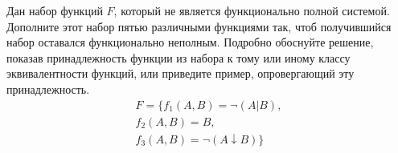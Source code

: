 \question
Дан набор функций $F$, который не является функционально полной системой. Дополните этот набор пятью различными функциями так, чтоб получившийся набор оставался функционально неполным. Подробно обоснуйте решение, показав  принадлежность функции из набора к тому или иному классу эквивалентности функций, или приведите пример, опровергающий эту принадлежность.  
\begin{gather*}
F = \{f_1(A,B) = \neg(A | B), \\
f_2(A,B) =  B, \\
f_3(A,B) =\neg( A \downarrow B)\}
\end{gather*}

